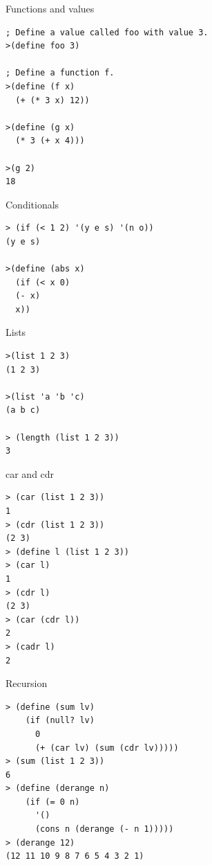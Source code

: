 \begin{frame}[fragile]{Functions and values}
\begin{verbatim}
; Define a value called foo with value 3.
>(define foo 3)

; Define a function f.	
>(define (f x)
  (+ (* 3 x) 12))

>(define (g x)
  (* 3 (+ x 4)))

>(g 2)
18
\end{verbatim}
\end{frame}

\begin{frame}[fragile]{Conditionals}
  \begin{verbatim}
> (if (< 1 2) '(y e s) '(n o))
(y e s)

>(define (abs x)
  (if (< x 0)
  (- x)
  x))

\end{verbatim}
\end{frame}


\begin{frame}[fragile]{Lists}
  \begin{verbatim}
>(list 1 2 3)
(1 2 3)

>(list 'a 'b 'c)
(a b c)

> (length (list 1 2 3))
3
\end{verbatim}
\end{frame}

\begin{frame}[fragile]{car and cdr}
  \begin{verbatim}
> (car (list 1 2 3))
1
> (cdr (list 1 2 3))
(2 3)
> (define l (list 1 2 3))
> (car l)
1
> (cdr l)
(2 3)
> (car (cdr l))
2
> (cadr l)
2
\end{verbatim}
\end{frame}

\begin{frame}[fragile]{Recursion}
  \begin{verbatim}
> (define (sum lv)              
    (if (null? lv)
      0
      (+ (car lv) (sum (cdr lv)))))
> (sum (list 1 2 3))                            
6
> (define (derange n)
    (if (= 0 n)
      '()
      (cons n (derange (- n 1)))))
> (derange 12)                                                    
(12 11 10 9 8 7 6 5 4 3 2 1)
\end{verbatim}
\end{frame}

